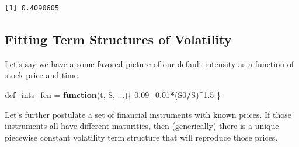 \documentclass[]{article}
\newenvironment{Shaded}{\begin{snugshade}}{\end{snugshade}}
\newcommand{\ControlFlowTok}[1]{\textcolor[rgb]{0.13,0.29,0.53}{\textbf{#1}}}
\newcommand{\FloatTok}[1]{\textcolor[rgb]{0.00,0.00,0.81}{#1}}
\newcommand{\NormalTok}[1]{#1}
\newcommand{\OperatorTok}[1]{\textcolor[rgb]{0.81,0.36,0.00}{\textbf{#1}}}
\newcommand{\StringTok}[1]{\textcolor[rgb]{0.31,0.60,0.02}{#1}}
\begin{document}
\begin{verbatim}
[1] 0.4090605
\end{verbatim}

\hypertarget{fitting-term-structures-of-volatility}{%
\subsection{Fitting Term Structures of
Volatility}\label{fitting-term-structures-of-volatility}}

Let's say we have a some favored picture of our default intensity as a
function of stock price and time.

\begin{Shaded}
\begin{Highlighting}[]
\NormalTok{  def_ints_fcn =}\StringTok{ }\ControlFlowTok{function}\NormalTok{(t, S, ...)\{}
    \FloatTok{0.09+0.01}\OperatorTok{*}\NormalTok{(S0}\OperatorTok{/}\NormalTok{S)}\OperatorTok{^}\FloatTok{1.5}
\NormalTok{    \}}
\end{Highlighting}
\end{Shaded}

Let's further postulate a set of financial instruments with known
prices. If those instruments all have different maturities, then
(generically) there is a unique piecewise constant volatility term
structure that will reproduce those prices.
\end{document}
